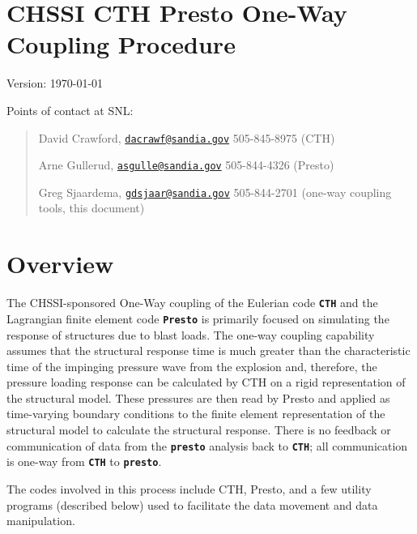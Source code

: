 \documentclass[11pt,twoside]{article}
\newcommand{\code}[1]
   {\mbox{\bf\tt #1}\null}
\begin{document}
\clearpage\pagestyle{Standard}
\section[CHSSI CTH Presto One{}-Way Coupling Procedure]{CHSSI CTH Presto
One{}-Way Coupling Procedure}
{Version: \centering \today}

Points of contact at SNL:
\begin{quote}
David Crawford,
\href{mailto:dacrawf@sandia.gov}{\nolinkurl{dacrawf@sandia.gov}}
505{}-845{}-8975  (CTH)

Arne Gullerud,
\href{mailto:asgulle@sandia.gov}{\nolinkurl{asgulle@sandia.gov}}
505{}-844{}-4326  (Presto)

Greg Sjaardema,
\href{mailto:gdsjaar@sandia.gov}{\nolinkurl{gdsjaar@sandia.gov}}
505{}-844{}-2701 (one{}-way coupling tools, this document)
\end{quote}

\section{Overview}
The CHSSI-sponsored One{}-Way coupling of the Eulerian code \code{CTH}
and the Lagrangian finite element code \code{Presto} is primarily
focused on simulating the response of structures due to blast loads.
The one-way coupling capability assumes that the structural response
time is much greater than the characteristic time of the impinging
pressure wave from the explosion and, therefore, the pressure loading
response can be calculated by CTH on a rigid representation of the
structural model.  These pressures are then read by Presto and applied
as time-varying boundary conditions to the finite element
representation of the structural model to calculate the structural
response.  There is no feedback or communication of data from the
\code{presto} analysis back to \code{CTH}; all communication is
one{}-way from \code{CTH} to \code{presto}.

The codes involved in this process include CTH, Presto, and a few
utility programs (described below) used to facilitate the data
movement and data manipulation.
\end{document}
